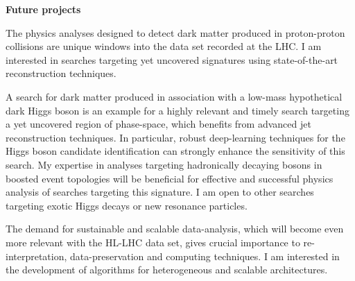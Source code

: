 \documentclass{article}
\begin{document}
\bigskip
{\bf Future projects}
\medskip

The physics analyses designed to detect dark matter produced in proton-proton collisions are unique windows into the data set recorded at the LHC. I am interested in searches targeting yet uncovered signatures using state-of-the-art reconstruction techniques.

A search for dark matter produced in association with a low-mass hypothetical dark Higgs boson is an example for a highly relevant and timely search targeting a yet uncovered region of phase-space, which benefits from advanced jet reconstruction techniques. In particular, robust deep-learning techniques for the Higgs boson candidate identification can strongly enhance the sensitivity of this search.
My expertise in analyses targeting hadronically decaying bosons in boosted event topologies will be beneficial for effective and successful physics analysis of searches targeting this signature. I am open to other searches targeting exotic Higgs decays or new resonance particles.

The demand for sustainable and scalable data-analysis, which will become even more relevant with the HL-LHC data set, gives crucial importance to re-interpretation, data-preservation and computing techniques. I am interested in the development of algorithms for heterogeneous and scalable architectures.


\printbibliography
\end{document}
